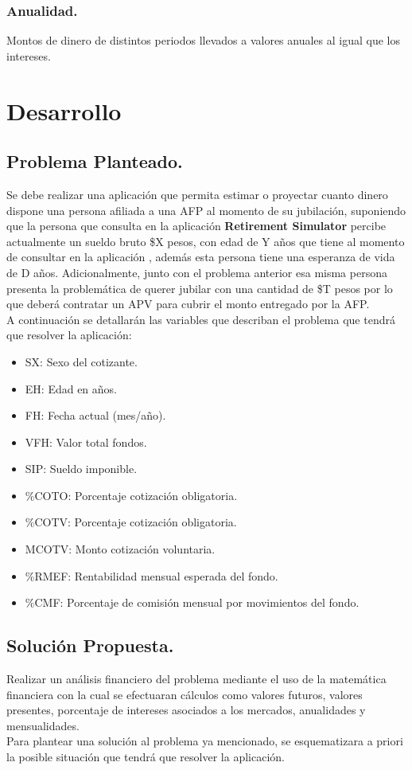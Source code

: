 \documentclass{udpreport}
\begin{document}
\subsection{Anualidad.}
Montos de dinero de distintos periodos llevados a valores anuales al igual que los intereses.

\chapter{Desarrollo}
\section{Problema Planteado.}
Se debe realizar una aplicación que permita estimar o proyectar cuanto dinero dispone una persona afiliada a una AFP al momento de su jubilación, suponiendo que la persona que consulta en la aplicación \textbf{Retirement Simulator} percibe actualmente un sueldo bruto \$X pesos, con edad de Y años que tiene al momento de consultar en la aplicación , además esta persona tiene una esperanza de vida de D años. Adicionalmente, junto con el problema anterior esa misma persona presenta la problemática de querer jubilar con una cantidad de \$T pesos por lo que deberá contratar un APV para cubrir el monto entregado por la AFP.
\\[0.8cm]
A continuación se detallarán las variables que describan el problema que tendrá que resolver la aplicación:
\begin{itemize}
    \item SX: Sexo del cotizante.
    \item EH: Edad en años.
    \item FH: Fecha actual (mes/año).
    \item VFH: Valor total fondos.
    \item SIP: Sueldo imponible.
    \item \%COTO: Porcentaje cotización obligatoria.
    \item \%COTV: Porcentaje cotización obligatoria.
    \item MCOTV: Monto cotización voluntaria.
    \item \%RMEF: Rentabilidad mensual esperada del fondo.
    \item \%CMF: Porcentaje de comisión mensual por movimientos del fondo.
\end{itemize}

\section{Solución Propuesta.}
Realizar un análisis financiero del problema mediante el uso de la matemática financiera con la cual se efectuaran cálculos como valores futuros, valores presentes, porcentaje de intereses asociados a los mercados, anualidades y mensualidades.\\
Para plantear una solución al problema ya mencionado, se esquematizara a priori la posible situación que tendrá que resolver la aplicación.\\
\end{document}
